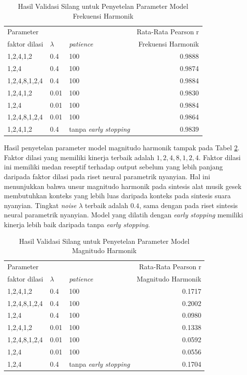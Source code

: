 \begin{table}[htbp]
    \centering
    \caption{Hasil Validasi Silang untuk Penyetelan Parameter Model Frekuensi Harmonik}\label{tab-freq-model-tuning-results}
    \begin{tabular}{ |l|l|l|r| } 
     \hline
     \multicolumn{3}{|l|}{Parameter} & Rata-Rata Pearson r\\
     \cline{1-3}
     faktor dilasi & $\lambda$ & \textit{patience} &Frekuensi Harmonik \\
	 \hline 
	1,2,4,1,2 & 0.4 &100           &0.9888\\\hline
	1,2,4 & 0.4 &100               &0.9874\\\hline
	1,2,4,8,1,2,4 & 0.4 &100       &0.9884\\\hline
	1,2,4,1,2 & 0.01 &100          &0.9830\\\hline
	1,2,4 & 0.01 &100              &0.9884\\\hline
	1,2,4,8,1,2,4 & 0.01 &100      &0.9864\\\hline
	1,2,4,1,2 & 0.4 &tanpa \textit{early stopping}   &0.9839\\\hline
    \end{tabular}
\end{table}

Hasil penyetelan parameter model magnitudo harmonik tampak pada Tabel \ref{tab-mag-model-tuning-results}. Faktor dilasi yang memiliki kinerja terbaik adalah $1,2,4,8,1,2,4$. Faktor dilasi ini memiliki medan reseptif terhadap output sebelum yang lebih panjang daripada faktor dilasi pada riset neural parametrik nyanyian. Hal ini menunjukkan bahwa unsur magnitudo harmonik pada sintesis alat musik gesek membutuhkan konteks yang lebih luas daripada konteks pada sintesis suara nyanyian. Tingkat \textit{noise} $\lambda$ terbaik adalah $0.4$, sama dengan pada riset sintesis neural parametrik nyanyian. Model yang dilatih dengan \textit{early stopping} memiliki kinerja lebih baik daripada tanpa \textit{early stopping}.

\begin{table}[htbp]
    \centering
    \caption{Hasil Validasi Silang untuk Penyetelan Parameter Model Magnitudo Harmonik}\label{tab-mag-model-tuning-results}
    \begin{tabular}{ |l|l|l|r| } 
     \hline
     \multicolumn{3}{|l|}{Parameter} & Rata-Rata Pearson r\\
     \cline{1-3}
     faktor dilasi & $\lambda$ & \textit{patience} & Magnitudo Harmonik\\
	 \hline 
	1,2,4,1,2 & 0.4 &100           &0.1717\\\hline
	1,2,4,8,1,2,4 & 0.4 &100       &0.2002\\\hline
	1,2,4 & 0.4 &100               &0.0980\\\hline
	1,2,4,1,2 & 0.01 &100          &0.1338\\\hline
	1,2,4,8,1,2,4 & 0.01 &100      &0.0592\\\hline
	1,2,4 & 0.01 &100              &0.0556\\\hline
	1,2,4 & 0.4 &tanpa \textit{early stopping}       &0.1704\\\hline
    \end{tabular}
\end{table}

